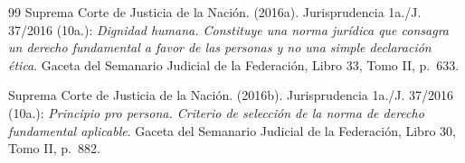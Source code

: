 \documentclass[12pt,spanish,letterpaper,oneside]{article}
\begin{document}
\begin{thebibliography}{99}
Suprema Corte de Justicia de la Naci\'on. (2016a). Jurisprudencia 1a./J. 37/2016 (10a.): \emph{Dignidad humana. Constituye una norma jur\'idica que consagra un derecho fundamental a favor de las personas y no una simple declaraci\'on \'etica}. Gaceta del Semanario Judicial de la Federaci\'on, Libro 33, Tomo II, p.~633.

Suprema Corte de Justicia de la Naci\'on. (2016b). Jurisprudencia 1a./J. 37/2016 (10a.): \emph{Principio pro persona. Criterio de selecci\'on de la norma de derecho fundamental aplicable}. Gaceta del Semanario Judicial de la Federaci\'on, Libro 30, Tomo II, p.~882.

\end{thebibliography}
\end{document}
